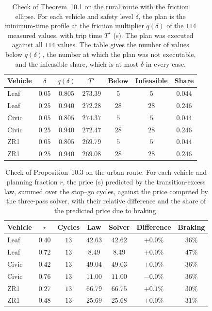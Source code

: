 \documentclass[12pt, twoside]{amsart}
\theoremstyle{definition}
\newcommand{\mainref}[2]{#2}
\begin{document}
\begin{table}[htbp]
\centering\small
\caption{Check of Theorem~\mainref{thm:chance}{10.1} on the rural route with the friction ellipse. For each vehicle and safety level $\delta$, the plan is the minimum-time profile at the friction multiplier $q(\delta)$ of the $114$ measured values, with trip time $T^\star$ (s). The plan was executed against all $114$ values. The table gives the number of values below $q(\delta)$, the number at which the plan was not executable, and the infeasible share, which is at most $\delta$ in every case.}\label{tab:app-chance}
\begin{tabular}{lcccccc}
\toprule
Vehicle & $\delta$ & $q(\delta)$ & $T^\star$ & Below & Infeasible & Share\\
\midrule
Leaf & $0.05$ & $0.805$ & $273.39$ & $5$ & $5$ & $0.044$\\
Leaf & $0.25$ & $0.940$ & $272.28$ & $28$ & $28$ & $0.246$\\
Civic & $0.05$ & $0.805$ & $274.37$ & $5$ & $5$ & $0.044$\\
Civic & $0.25$ & $0.940$ & $272.47$ & $28$ & $28$ & $0.246$\\
ZR1 & $0.05$ & $0.805$ & $269.79$ & $5$ & $5$ & $0.044$\\
ZR1 & $0.25$ & $0.940$ & $269.08$ & $28$ & $28$ & $0.246$\\
\bottomrule
\end{tabular}
\end{table}

\begin{table}[htbp]
\centering\small
\caption{Check of Proposition~\mainref{prop:excess}{10.3} on the urban route. For each vehicle and planning fraction $r$, the price (s) predicted by the transition-excess law, summed over the stop--go cycles, against the price computed by the three-pass solver, with their relative difference and the share of the predicted price due to braking.}\label{tab:app-excess}
\begin{tabular}{lcccccc}
\toprule
Vehicle & $r$ & Cycles & Law & Solver & Difference & Braking\\
\midrule
Leaf & $0.40$ & $13$ & $42.63$ & $42.62$ & $+0.0\%$ & $36\%$\\
Leaf & $0.72$ & $13$ & $8.49$ & $8.49$ & $+0.0\%$ & $47\%$\\
Civic & $0.42$ & $13$ & $49.04$ & $49.03$ & $+0.0\%$ & $36\%$\\
Civic & $0.76$ & $13$ & $11.00$ & $11.00$ & $-0.0\%$ & $36\%$\\
ZR1 & $0.27$ & $13$ & $66.79$ & $66.75$ & $+0.1\%$ & $30\%$\\
ZR1 & $0.48$ & $13$ & $25.69$ & $25.68$ & $+0.0\%$ & $31\%$\\
\bottomrule
\end{tabular}
\end{table}
\FloatBarrier
\end{document}
